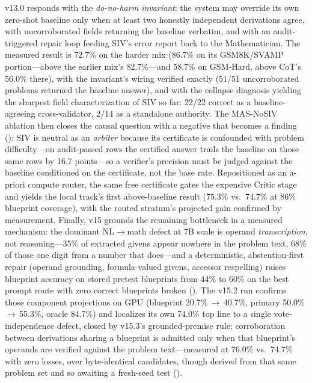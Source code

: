 \documentclass[11pt,a4paper]{article}
\begin{document}
v13.0 responds with the \emph{do-no-harm invariant}: the system may override its own zero-shot baseline only when at least two honestly independent derivations agree, with uncorroborated fields returning the baseline verbatim, and with an audit-triggered repair loop feeding SIV's error report back to the Mathematician.
The measured result is 72.7\% on the harder mix (86.7\% on its GSM8K/SVAMP portion---above the earlier mix's 82.7\%---and 58.7\% on GSM-Hard, above CoT's 56.0\% there), with the invariant's wiring verified exactly (51/51 uncorroborated problems returned the baseline answer), and with the collapse diagnosis yielding the sharpest field characterization of SIV so far: 22/22 correct as a baseline-agreeing cross-validator, 2/14 as a standalone authority.
The MAS-NoSIV ablation then closes the causal question with a negative that becomes a finding (): SIV is neutral as an \emph{arbiter} because its certificate is confounded with problem difficulty---on audit-passed rows the certified answer trails the baseline on those same rows by 16.7 points---so a verifier's precision must be judged against the baseline conditioned on the certificate, not the base rate.
Repositioned as an a-priori compute router, the same free certificate gates the expensive Critic stage and yields the local track's first above-baseline result (75.3\% vs.\ 74.7\% at 86\% blueprint coverage), with the routed stratum's projected gain confirmed by measurement.
Finally, v15 grounds the remaining bottleneck in a measured mechanism: the dominant NL$\to$math defect at 7B scale is operand \emph{transcription}, not reasoning---35\% of extracted givens appear nowhere in the problem text, 68\% of those one digit from a number that does---and a deterministic, abstention-first repair (operand grounding, formula-valued givens, accessor respelling) raises blueprint accuracy on stored pretest blueprints from 44\% to 60\% on the best prompt route with zero correct blueprints broken ().
The v15.2 run confirms those component projections on GPU (blueprint 20.7\%\,$\to$\,40.7\%, primary 50.0\%\,$\to$\,55.3\%, oracle 84.7\%) and localizes its own 74.0\% top line to a single vote-independence defect, closed by v15.3's grounded-premise rule: corroboration between derivations sharing a blueprint is admitted only when that blueprint's operands are verified against the problem text---measured at 76.0\% vs.\ 74.7\% with zero losses, over byte-identical candidates, though derived from that same problem set and so awaiting a fresh-seed test ().
\end{document}
